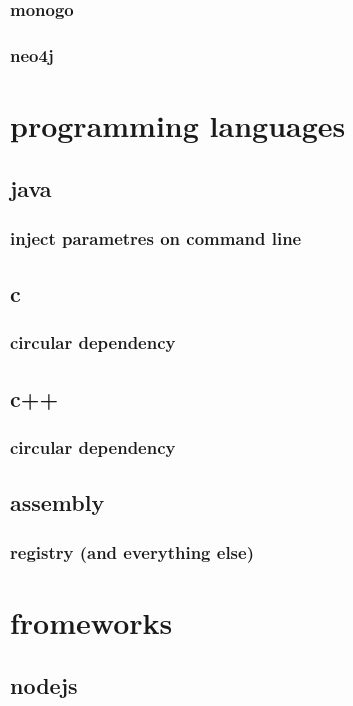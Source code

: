 \documentclass{report}
\begin{document}
\subsection{monogo}
\subsection{neo4j}

\chapter{programming languages}
\section{java}
\subsection{inject parametres on command line}

\section{c}
\subsection{circular dependency}

\section{c++}
\subsection{circular dependency}

\section{assembly}
\subsection{registry (and everything else)}


\chapter{fromeworks}
\section{nodejs}
\end{document}
